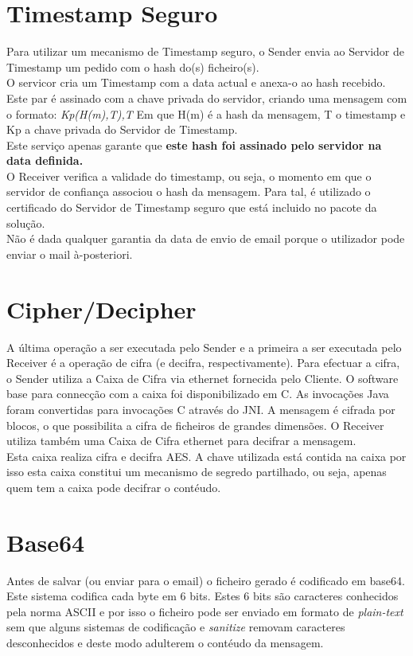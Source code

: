 \section{Timestamp Seguro}
\label{section:timestamp}
Para utilizar um mecanismo de Timestamp seguro, o Sender envia ao Servidor de Timestamp um pedido com o hash do(s) ficheiro(s).\\
 O servicor cria um Timestamp com a data actual e anexa-o ao hash recebido. Este par é assinado com a chave privada do servidor, criando uma mensagem com o formato: \textit{Kp(H(m),T),T}
Em que H(m) é a hash da mensagem, T o timestamp e Kp a chave privada do Servidor de Timestamp. \\
Este serviço apenas garante que \textbf{este hash foi assinado pelo servidor na data definida.} \\

O Receiver verifica a validade do timestamp, ou seja, o momento em que o servidor de confiança associou o hash da mensagem. Para tal, é utilizado o certificado do Servidor de Timestamp seguro que está incluido no pacote da solução. \\
Não é dada qualquer garantia da data de envio de email porque o utilizador pode enviar o mail à-posteriori. \\

\section{Cipher/Decipher}
A última operação a ser executada pelo Sender e a primeira a ser executada pelo Receiver é a operação de cifra (e decifra, respectivamente).
Para efectuar a cifra, o Sender utiliza a Caixa de Cifra via ethernet fornecida pelo Cliente. O software base para connecção com a caixa foi disponibilizado em C. As invocações Java foram convertidas para invocações C através do JNI.
A mensagem é cifrada por blocos, o que possibilita a cifra de ficheiros de grandes dimensões.
O Receiver utiliza também uma Caixa de Cifra ethernet para decifrar a mensagem.\\
Esta caixa realiza cifra e decifra AES. A chave utilizada está contida na caixa por isso esta caixa constitui um mecanismo de segredo partilhado, ou seja, apenas quem tem a caixa pode decifrar o contéudo.

\section{Base64}
Antes de salvar (ou enviar para o email) o ficheiro gerado é codificado em base64. Este sistema codifica cada byte em 6 bits. Estes 6 bits são caracteres conhecidos pela norma ASCII e por isso o ficheiro pode ser enviado em formato de \textit{plain-text} sem que alguns sistemas de codificação e \textit{sanitize} removam caracteres desconhecidos e deste modo adulterem o contéudo da mensagem.


